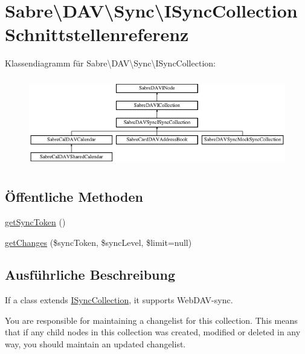 \hypertarget{interface_sabre_1_1_d_a_v_1_1_sync_1_1_i_sync_collection}{}\section{Sabre\textbackslash{}D\+AV\textbackslash{}Sync\textbackslash{}I\+Sync\+Collection Schnittstellenreferenz}
\label{interface_sabre_1_1_d_a_v_1_1_sync_1_1_i_sync_collection}
Klassendiagramm für Sabre\textbackslash{}D\+AV\textbackslash{}Sync\textbackslash{}I\+Sync\+Collection\+:\begin{figure}[H]
\begin{center}
\leavevmode
\includegraphics[height=3.921569cm]{interface_sabre_1_1_d_a_v_1_1_sync_1_1_i_sync_collection}
\end{center}
\end{figure}
\subsection*{Öffentliche Methoden}
\begin{DoxyCompactItemize}
\item 
\mbox{\hyperlink{interface_sabre_1_1_d_a_v_1_1_sync_1_1_i_sync_collection_ae8b002d4a88dc34170f9468b5009e08f}{get\+Sync\+Token}} ()
\item 
\mbox{\hyperlink{interface_sabre_1_1_d_a_v_1_1_sync_1_1_i_sync_collection_aa47423825bfcce42d78266f920393aed}{get\+Changes}} (\$sync\+Token, \$sync\+Level, \$limit=null)
\end{DoxyCompactItemize}


\subsection{Ausführliche Beschreibung}
If a class extends \mbox{\hyperlink{interface_sabre_1_1_d_a_v_1_1_sync_1_1_i_sync_collection}{I\+Sync\+Collection}}, it supports Web\+D\+A\+V-\/sync.

You are responsible for maintaining a changelist for this collection. This means that if any child nodes in this collection was created, modified or deleted in any way, you should maintain an updated changelist.

